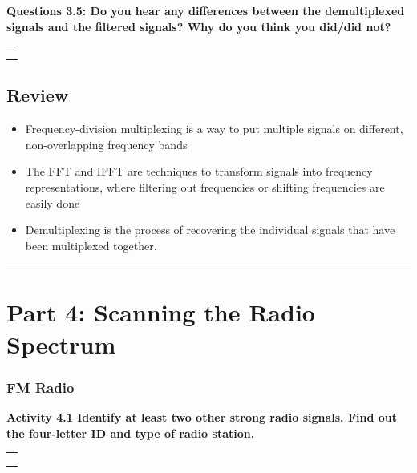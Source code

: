 \documentclass[11pt]{article}
\providecommand{\tightlist}{%
      \setlength{\itemsep}{0pt}\setlength{\parskip}{0pt}}
\begin{document}
\textbf{Questions 3.5: Do you hear any differences between the
demultiplexed signals and the filtered signals? Why do you think you
did/did not?}

\begin{longtable}[]{@{}l@{}}
\toprule
 \\
\midrule
\endhead
 \\
 \\
 \\
\bottomrule
\end{longtable}

\hypertarget{review}{%
\subsection*{Review}\label{review}}

\begin{itemize}
\tightlist
\item
  Frequency-division multiplexing is a way to put multiple signals on
  different, non-overlapping frequency bands
\item
  The FFT and IFFT are techniques to transform signals into frequency
  representations, where filtering out frequencies or shifting
  frequencies are easily done
\item
  Demultiplexing is the process of recovering the individual signals
  that have been multiplexed together.
\end{itemize}

    \begin{center}\rule{\linewidth}{0.5pt}\end{center}
    \newpage

\hypertarget{part-4-scanning-the-radio-spectrum}{%
\section*{Part 4: Scanning the Radio
Spectrum}\label{part-4-scanning-the-radio-spectrum}}

\hypertarget{fm-radio}{%
\subsubsection*{FM Radio}\label{fm-radio}}

\textbf{Activity 4.1 Identify at least two other strong radio signals.
Find out the four-letter ID and type of radio station.}

\begin{longtable}[]{@{}l@{}}
\toprule
 \\
\midrule
\endhead
 \\
 \\
 \\
\bottomrule
\end{longtable}
\end{document}
